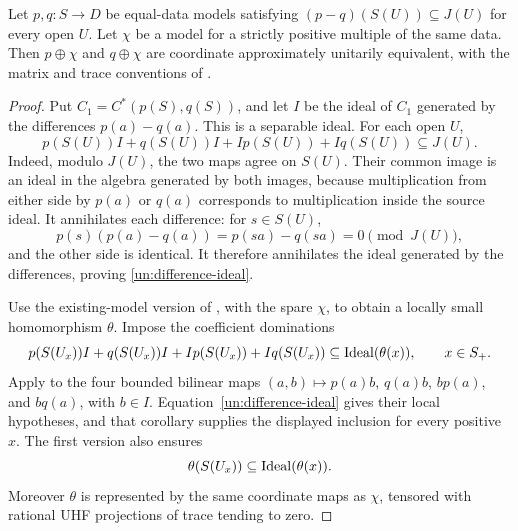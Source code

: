 \begin{proposition}\label{un:spare}
Let $p,q:S\to D$ be equal-data models satisfying
$(p-q)(S(U))\subseteq J(U)$ for every open $U$.  Let $\chi$ be a
model for a strictly positive multiple of the same data.  Then
$p\oplus\chi$ and $q\oplus\chi$ are coordinate approximately
unitarily equivalent, with the matrix and trace conventions of
.
\end{proposition}

\begin{proof}
Put $C_1=C^*(p(S),q(S))$, and let $I$ be the ideal of $C_1$
generated by the differences $p(a)-q(a)$.  This is a separable
ideal.  For each open $U$,
\begin{equation}\label{un:difference-ideal}
 p(S(U))I+q(S(U))I+Ip(S(U))+Iq(S(U))\subseteq J(U).
\end{equation}
Indeed, modulo $J(U)$, the two maps agree on $S(U)$.  Their common
image is an ideal in the algebra generated by both images, because
multiplication from either side by $p(a)$ or $q(a)$ corresponds to
multiplication inside the source ideal.  It annihilates each
difference: for $s\in S(U)$,
\[
 p(s)(p(a)-q(a))=p(sa)-q(sa)=0\pmod{J(U)},
\]
and the other side is identical.  It therefore annihilates the
ideal generated by the differences, proving
\eqref{un:difference-ideal}.

Use the existing-model version of , with
the spare $\chi$, to obtain a locally small homomorphism $\theta$.
Impose the coefficient dominations
\begin{equation}\label{un:theta-domination}
 p(S(U_x))I+q(S(U_x))I+Ip(S(U_x))+Iq(S(U_x))
 \subseteq\operatorname{Ideal}(\theta(x)),\qquad x\in S_+.
\end{equation}
Apply  to the four bounded
bilinear maps $(a,b)\mapsto p(a)b$, $q(a)b$, $bp(a)$, and $bq(a)$,
with $b\in I$.  Equation~\eqref{un:difference-ideal} gives their
local hypotheses, and that corollary supplies the displayed inclusion
for every positive $x$.  The first version also ensures
\begin{equation}\label{un:theta-range-fullness}
 \theta(S(U_x))\subseteq\operatorname{Ideal}(\theta(x)).
\end{equation}
Moreover $\theta$ is represented by the same coordinate maps as
$\chi$, tensored with rational UHF projections of trace tending
to zero.


\end{proof}
